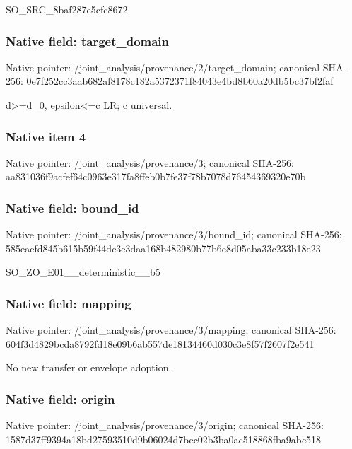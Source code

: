 \documentclass[10pt,a4paper]{article}
\begin{document}
\begingroup\raggedright\sloppy SO\_\allowbreak{}SRC\_\allowbreak{}8baf287e5cfc8672\par\endgroup

\subsubsection{Native field: target\_\allowbreak{}domain}
Native pointer: /joint\_\allowbreak{}analysis/provenance/2/target\_\allowbreak{}domain; canonical SHA-256: 0e7f252cc3aab682af8178c182a5372371f84043e4bd8b60a20db5bc37bf2faf

\begingroup\raggedright\sloppy d>=\allowbreak{}d\_\allowbreak{}0,\allowbreak{} epsilon<=\allowbreak{}c LR;\allowbreak{} c universal.\par\endgroup

\subsubsection{Native item 4}
Native pointer: /joint\_\allowbreak{}analysis/provenance/3; canonical SHA-256: aa831036f9acfef64c0963e317fa8ffeb0b7fe37f78b7078d76454369320e70b

\subsubsection{Native field: bound\_\allowbreak{}id}
Native pointer: /joint\_\allowbreak{}analysis/provenance/3/bound\_\allowbreak{}id; canonical SHA-256: 585eaefd845b615b59f44dc3e3daa168b482980b77b6e8d05aba33c233b18e23

\begingroup\raggedright\sloppy SO\_\allowbreak{}ZO\_\allowbreak{}E01\_\allowbreak{}\_\allowbreak{}deterministic\_\allowbreak{}\_\allowbreak{}b5\par\endgroup

\subsubsection{Native field: mapping}
Native pointer: /joint\_\allowbreak{}analysis/provenance/3/mapping; canonical SHA-256: 604f3d4829bcda8792fd18e09b6ab557de18134460d030c3e8f57f2607f2e541

\begingroup\raggedright\sloppy No new transfer or envelope adoption.\par\endgroup

\subsubsection{Native field: origin}
Native pointer: /joint\_\allowbreak{}analysis/provenance/3/origin; canonical SHA-256: 1587d37ff9394a18bd27593510d9b06024d7bec02b3ba0ac518868fba9abc518
\end{document}

